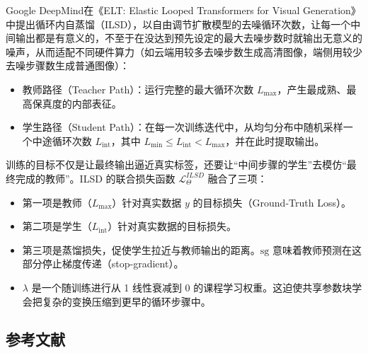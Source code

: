Google DeepMind在《ELT: Elastic Looped Transformers for Visual Generation》中提出循环内自蒸馏（ILSD），以自由调节扩散模型的去噪循环次数，让每一个中间输出都是有意义的，不至于在没达到预先设定的最大去噪步数时就输出无意义的噪声，从而适配不同硬件算力（如云端用较多去噪步数生成高清图像，端侧用较少去噪步骤数生成普通图像）：

\begin{itemize}
\tightlist
\item
  教师路径（Teacher Path）：运行完整的最大循环次数 \(L_{\max}\)，产生最成熟、最高保真度的内部表征。
\item
  学生路径（Student Path）：在每一次训练迭代中，从均匀分布中随机采样一个中途循环次数 \(L_{\mathrm{int}}\)，其中 \(L_{\min}\le L_{\mathrm{int}}\lt L_{\max}\)，并在此时提取输出。
\end{itemize}

训练的目标不仅是让最终输出逼近真实标签，还要让``中间步骤的学生''去模仿``最终完成的教师''。ILSD 的联合损失函数 \(\mathcal{L}^{ILSD}_{\Theta}\) 融合了三项：

\begin{itemize}
\tightlist
\item
  第一项是教师（\(L_{\max}\)）针对真实数据 \(y\) 的目标损失（Ground-Truth Loss）。
\item
  第二项是学生（\(L_{\mathrm{int}}\)）针对真实数据的目标损失。
\item
  第三项是蒸馏损失，促使学生拉近与教师输出的距离。\(\mathrm{sg}\) 意味着教师预测在这部分停止梯度传递（stop-gradient）。
\item
  \(\lambda\) 是一个随训练进行从 1 线性衰减到 0 的课程学习权重。这迫使共享参数块学会把复杂的变换压缩到更早的循环步骤中。
\end{itemize}

\hypertarget{ux53c2ux8003ux6587ux732e-178}{%
\subsection{参考文献}\label{ux53c2ux8003ux6587ux732e-178}}

